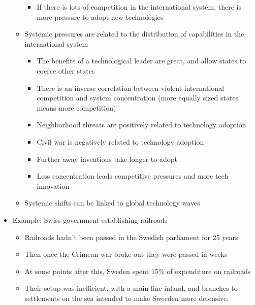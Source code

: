 \documentclass[11pt]{article}
\begin{document}
\begin{itemize}
\begin{itemize}
\begin{itemize}
\item If there is lots of competition in the international system, there is more
pressure to adopt new technologies
\end{itemize}
\item Systemic pressures are related to the distribution of capabilities in the
international system
\begin{itemize}
\item The benefits of a technological leader are great, and allow states to
coerce other states
\item There is an inverse correlation between violent international competition
and system concentration (more equally sized states means more competition)
\item Neighborhood threats are positively related to technology adoption
\item Civil war is negatively related to technology adoption
\item Further away inventions take longer to adopt
\item Less concentration leads competitive pressures and more tech innovation
\end{itemize}
\item Systemic shifts can be linked to global technology waves
\end{itemize}
\item Example: Swiss government establishing railroads
\begin{itemize}
\item Railroads hadn't been passed in the Swedish parliament for 25 years
\item Then once the Crimean war broke out they were passed in weeks
\item At some points after this, Sweden spent 15\% of expenditure on railroads
\item Their setup was inefficient, with a main line inland, and branches to
settlements on the sea intended to make Sweeden more defensive.
\end{itemize}
\end{itemize}
\end{document}
